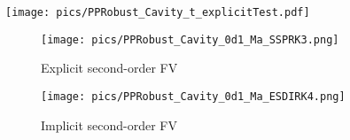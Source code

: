 
\begin{figure}[htbp!]
    \centering
    \texttt{[image: pics/PPRobust\_Cavity\_t\_explicitTest.pdf]}
    \caption{}
    \label{fig:Cavity_time_explicitTest}
\end{figure}

\begin{figure}[htbp]
    \centering
    \begin{subfigure}{0.5\textwidth}
        \texttt{[image: pics/PPRobust\_Cavity\_0d1\_Ma\_SSPRK3.png]}
        \caption[]{Explicit second-order FV}
    \end{subfigure}\hfill
    \begin{subfigure}{0.5\textwidth}
        \texttt{[image: pics/PPRobust\_Cavity\_0d1\_Ma\_ESDIRK4.png]}
        \caption[]{Implicit second-order FV}
    \end{subfigure}
    \caption{}
    \label{fig:Cavity_0d1}
\end{figure}





